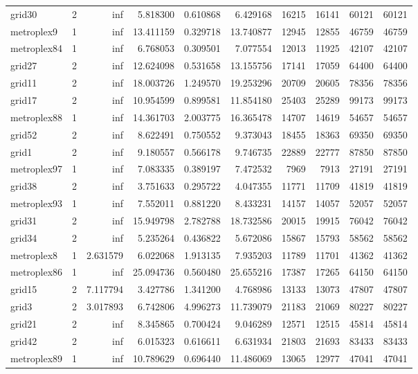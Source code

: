 \begin{longtable}{|l|r|r|r|r|r|r|r|r|r|}
grid30 & 2 & inf & 5.818300 & 0.610868 & 6.429168 & 16215 & 16141 & 60121 & 60121 \\
metroplex9 & 1 & inf & 13.411159 & 0.329718 & 13.740877 & 12945 & 12855 & 46759 & 46759 \\
metroplex84 & 1 & inf & 6.768053 & 0.309501 & 7.077554 & 12013 & 11925 & 42107 & 42107 \\
grid27 & 2 & inf & 12.624098 & 0.531658 & 13.155756 & 17141 & 17059 & 64400 & 64400 \\
grid11 & 2 & inf & 18.003726 & 1.249570 & 19.253296 & 20709 & 20605 & 78356 & 78356 \\
grid17 & 2 & inf & 10.954599 & 0.899581 & 11.854180 & 25403 & 25289 & 99173 & 99173 \\
metroplex88 & 1 & inf & 14.361703 & 2.003775 & 16.365478 & 14707 & 14619 & 54657 & 54657 \\
grid52 & 2 & inf & 8.622491 & 0.750552 & 9.373043 & 18455 & 18363 & 69350 & 69350 \\
grid1 & 2 & inf & 9.180557 & 0.566178 & 9.746735 & 22889 & 22777 & 87850 & 87850 \\
metroplex97 & 1 & inf & 7.083335 & 0.389197 & 7.472532 & 7969 & 7913 & 27191 & 27191 \\
grid38 & 2 & inf & 3.751633 & 0.295722 & 4.047355 & 11771 & 11709 & 41819 & 41819 \\
metroplex93 & 1 & inf & 7.552011 & 0.881220 & 8.433231 & 14157 & 14057 & 52057 & 52057 \\
grid31 & 2 & inf & 15.949798 & 2.782788 & 18.732586 & 20015 & 19915 & 76042 & 76042 \\
grid34 & 2 & inf & 5.235264 & 0.436822 & 5.672086 & 15867 & 15793 & 58562 & 58562 \\
metroplex8 & 1 & 2.631579 & 6.022068 & 1.913135 & 7.935203 & 11789 & 11701 & 41362 & 41362 \\
metroplex86 & 1 & inf & 25.094736 & 0.560480 & 25.655216 & 17387 & 17265 & 64150 & 64150 \\
grid15 & 2 & 7.117794 & 3.427786 & 1.341200 & 4.768986 & 13133 & 13073 & 47807 & 47807 \\
grid3 & 2 & 3.017893 & 6.742806 & 4.996273 & 11.739079 & 21183 & 21069 & 80227 & 80227 \\
grid21 & 2 & inf & 8.345865 & 0.700424 & 9.046289 & 12571 & 12515 & 45814 & 45814 \\
grid42 & 2 & inf & 6.015323 & 0.616611 & 6.631934 & 21803 & 21693 & 83433 & 83433 \\
metroplex89 & 1 & inf & 10.789629 & 0.696440 & 11.486069 & 13065 & 12977 & 47041 & 47041 \\

\end{longtable}
